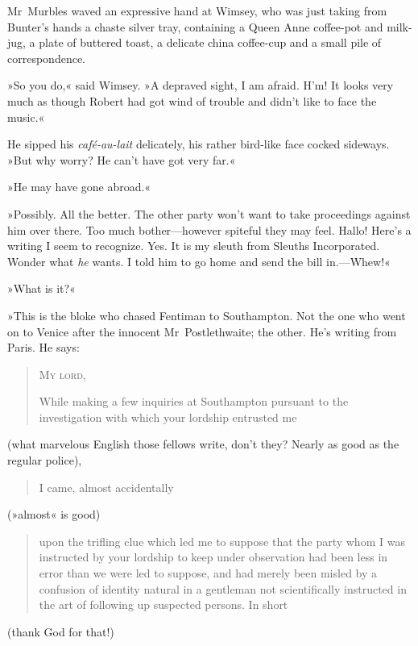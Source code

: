 Mr~Murbles waved an expressive hand at Wimsey, who was just taking from Bunter's hands a chaste silver tray, containing a Queen Anne coffee-pot and milk-jug, a plate of buttered toast, a delicate china coffee-cup and a small pile of correspondence.

»So you do,« said Wimsey. »A depraved sight, I am afraid. H'm! It looks very much as though Robert had got wind of trouble and didn't like to face the music.«

He sipped his \textit{café-au-lait} delicately, his rather bird-like face cocked sideways. »But why worry? He can't have got very far.«

»He may have gone abroad.«

»Possibly. All the better. The other party won't want to take proceedings against him over there. Too much bother—however spiteful they may feel. Hallo! Here's a writing I seem to recognize. Yes. It is my sleuth from Sleuths Incorporated. Wonder what \textit{he} wants. I told him to go home and send the bill in.—Whew!«

»What is it?«

»This is the bloke who chased Fentiman to Southampton. Not the one who went on to Venice after the innocent Mr~Postlethwaite; the other. He's writing from Paris. He says:

\begin{quotation}
\noindent \textsc{My lord,}

While making a few inquiries at Southampton pursuant to the investigation with which your lordship entrusted me 
\end{quotation}

(what marvelous English those fellows write, don't they? Nearly as good as the regular police), 

\begin{quotation}I came, almost accidentally\end{quotation} 

(»almost« is good) 

\begin{quotation}
	upon the trifling clue which led me to suppose that the party whom I was instructed by your lordship to keep under observation had been less in error than we were led to suppose, and had merely been misled by a confusion of identity natural in a gentleman not scientifically instructed in the art of following up suspected persons. In short
\end{quotation} 

(thank God for that!) 

